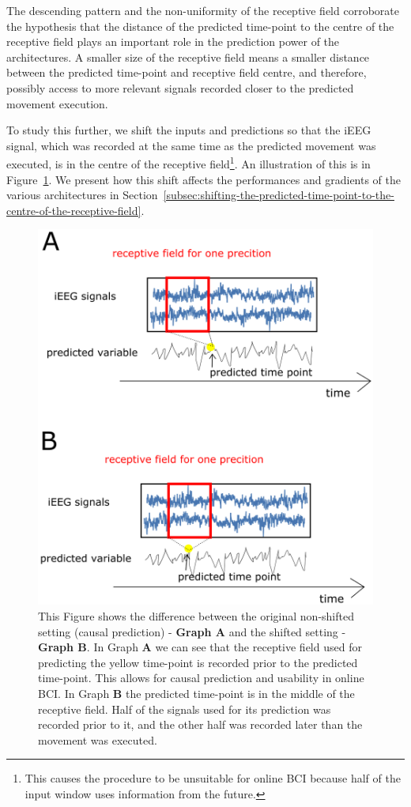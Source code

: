 The descending pattern and the non-uniformity of the receptive field corroborate the hypothesis that the distance of the predicted time-point to the centre of the receptive field plays an important role in the prediction power of the architectures.
A smaller size of the receptive field means a smaller distance between the predicted time-point and receptive field centre, and therefore, possibly access to more relevant signals recorded closer to the predicted movement execution.

To study this further, we shift the inputs and predictions so that the iEEG signal, which was recorded at the same time as the predicted movement was executed, is in the centre of the receptive field\footnote{This causes the procedure to be unsuitable for online BCI because half of the input window uses information from the future.}. An illustration of this is in Figure~\ref{fig:image-of-shifting}. 
We present how this shift affects the performances and gradients of the various architectures in Section~\ref{subsec:shifting-the-predicted-time-point-to-the-centre-of-the-receptive-field}.

\begin{figure}[!htbp]
\centering
   \includegraphics[width=0.8\linewidth]{img/ch4/shifted-vs-non-shifted-image.png}
   \caption[Shifted vs. non-shifted setting - scheme]{This Figure shows the difference between the original non-shifted setting (causal prediction) - \textbf{Graph A} and the shifted setting - \textbf{Graph B}. In Graph \textbf{A} we can see that the receptive field used for predicting the yellow time-point is recorded prior to the predicted time-point. This allows for causal prediction and usability in online BCI. In Graph \textbf{B} the predicted time-point is in the middle of the receptive field. Half of the signals used for its prediction was recorded prior to it, and the other half was recorded later than the movement was executed.}
   \label{fig:image-of-shifting}
\end{figure}

